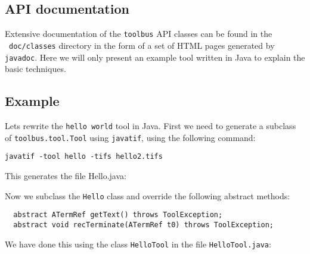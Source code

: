 \subsection{API documentation}

Extensive documentation of the {\tt toolbus} API classes can be found
in the \TB\ {\tt doc/classes} directory in the form of a set of HTML
pages generated by {\tt javadoc}. Here we will only present an example
tool written in Java to explain the basic techniques.

\subsection{Example}

Lets rewrite the {\tt hello world} tool in Java. First we need to
generate a subclass of {\tt toolbus.tool.Tool} using {\tt javatif},
using the following command:

\begin{verbatim}
javatif -tool hello -tifs hello2.tifs
\end{verbatim}

This generates the file Hello.java:



Now we subclass the {\tt Hello} class and override the following 
abstract methods:

\begin{verbatim}
  abstract ATermRef getText() throws ToolException;
  abstract void recTerminate(ATermRef t0) throws ToolException;
\end{verbatim}

We have done this using the class {\tt HelloTool} in the
file {\tt HelloTool.java}:



